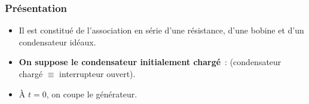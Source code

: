 \documentclass[../../main/main.tex]{subfiles}
\begin{document}
\subsubsection{Présentation}
\begin{minipage}[c]{.6\linewidth}
	\begin{itemize}
		\item Il est constitué de l'association en série d'une résistance, d'une
		      bobine et d'un condensateur idéaux.
		\item \textbf{On suppose le condensateur initialement chargé}~:
		       (condensateur chargé
		      $\equiv$ interrupteur ouvert).
		\item À $t=0$, on coupe le générateur.
	\end{itemize}
\end{minipage}
\hfill
\begin{minipage}[c]{.35\linewidth}
	~
	\begin{center}
	\end{center}
\end{minipage}
\end{document}
